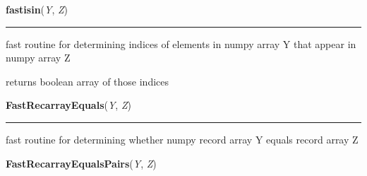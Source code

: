     \vspace{0.5ex}

\hspace{.8\funcindent}\begin{boxedminipage}{\funcwidth}

    \raggedright \textbf{fastisin}(\textit{Y}, \textit{Z})

    \vspace{-1.5ex}

    \rule{\textwidth}{0.5\fboxrule}
\setlength{\parskip}{2ex}
    fast routine for determining indices of elements in numpy array Y that 
    appear in numpy array Z

    returns boolean array of those indices

\setlength{\parskip}{1ex}
    \end{boxedminipage}

    \label{System:Utils:FastRecarrayEquals}

    \vspace{0.5ex}

\hspace{.8\funcindent}\begin{boxedminipage}{\funcwidth}

    \raggedright \textbf{FastRecarrayEquals}(\textit{Y}, \textit{Z})

    \vspace{-1.5ex}

    \rule{\textwidth}{0.5\fboxrule}
\setlength{\parskip}{2ex}
    fast routine for determining whether numpy record array Y equals record
    array Z

\setlength{\parskip}{1ex}
    \end{boxedminipage}

    \label{System:Utils:FastRecarrayEqualsPairs}

    \vspace{0.5ex}

\hspace{.8\funcindent}\begin{boxedminipage}{\funcwidth}

    \raggedright \textbf{FastRecarrayEqualsPairs}(\textit{Y}, \textit{Z})

\setlength{\parskip}{2ex}
\setlength{\parskip}{1ex}
    \end{boxedminipage}

